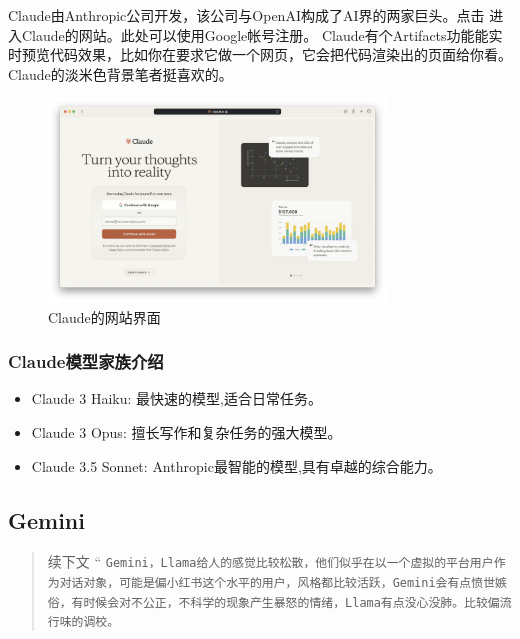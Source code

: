 \textsf{Claude}由\textsf{Anthropic}公司开发，该公司与\textsf{OpenAI}构成了AI界的两家巨头。点击 \href{https://claude.ai}{\color{black}\faLink} 进入\textsf{Claude}的网站。此处可以使用\textsf{Google}帐号注册。
\textsf{Claude}有个\textsf{Artifacts}功能能实时预览代码效果，比如你在要求它做一个网页，它会把代码渲染出的页面给你看。\textsf{Claude}的淡米色背景笔者挺喜欢的。
\begin{figure}[H]
    \centering
    \includegraphics[width=0.8\textwidth]{pics/Claude.png}
    \caption{\textsf{Claude}的网站界面}
\end{figure}

\subsubsection*{\textsf{Claude}模型家族介绍}
\begin{itemize}
    \item \textsf{Claude 3 Haiku}: 最快速的模型,适合日常任务。
    \item \textsf{Claude 3 Opus}: 擅长写作和复杂任务的强大模型。
    \item \textsf{Claude 3.5 Sonnet}: \textsf{Anthropic}最智能的模型,具有卓越的综合能力。
\end{itemize}

\subsection{\textsf{Gemini}}

\begin{quote}{续下文}
    \Huge{“}
    \normalsize \texttt{Gemini，Llama给人的感觉比较松散，他们似乎在以一个虚拟的平台用户作为对话对象，可能是偏小红书这个水平的用户，风格都比较活跃，Gemini会有点愤世嫉俗，有时候会对不公正，不科学的现象产生暴怒的情绪，Llama有点没心没肺。比较偏流行味的调校。}
    \end{quote}

